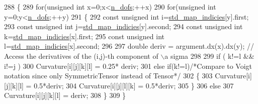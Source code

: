 \begin{DoxyCode}
288     \{
289          \textcolor{keywordflow}{for}(\textcolor{keywordtype}{unsigned} \textcolor{keywordtype}{int} x=0;x<\hyperlink{classSacado__Wrapper_1_1SymTensor2_ad9d6542de5481e0d41bd1831cb0aeaff}{n\_dofs};++x)
290             \textcolor{keywordflow}{for}(\textcolor{keywordtype}{unsigned} \textcolor{keywordtype}{int} y=0;y<\hyperlink{classSacado__Wrapper_1_1SymTensor2_ad9d6542de5481e0d41bd1831cb0aeaff}{n\_dofs};++y)
291             \{
292                 \textcolor{keyword}{const} \textcolor{keywordtype}{unsigned} \textcolor{keywordtype}{int} i=\hyperlink{classSacado__Wrapper_1_1SymTensor2_a1c6b89438714315ae209f4687b687505}{std\_map\_indicies}[y].first;
293                 \textcolor{keyword}{const} \textcolor{keywordtype}{unsigned} \textcolor{keywordtype}{int} j=\hyperlink{classSacado__Wrapper_1_1SymTensor2_a1c6b89438714315ae209f4687b687505}{std\_map\_indicies}[y].second;
294                 \textcolor{keyword}{const} \textcolor{keywordtype}{unsigned} \textcolor{keywordtype}{int} k=\hyperlink{classSacado__Wrapper_1_1SymTensor2_a1c6b89438714315ae209f4687b687505}{std\_map\_indicies}[x].first;
295                 \textcolor{keyword}{const} \textcolor{keywordtype}{unsigned} \textcolor{keywordtype}{int} l=\hyperlink{classSacado__Wrapper_1_1SymTensor2_a1c6b89438714315ae209f4687b687505}{std\_map\_indicies}[x].second;
296 
297                 \textcolor{keywordtype}{double} deriv = argument.dx(x).dx(y); \textcolor{comment}{// Access the derivatives of the (i,j)-th component of
       \(\backslash\)a sigma}
298 
299                 \textcolor{keywordflow}{if} ( k!=l && i!=j )
300                     Curvature[i][j][k][l] = 0.25* deriv;
301                 \textcolor{keywordflow}{else} \textcolor{keywordflow}{if}(k!=l)\textcolor{comment}{/*Compare to Voigt notation since only SymmetricTensor instead of Tensor*/}
302                 \{
303                     Curvature[i][j][k][l] = 0.5*deriv;
304                     Curvature[i][j][l][k] = 0.5*deriv;
305                 \}
306                 \textcolor{keywordflow}{else}
307                     Curvature[i][j][k][l] = deriv;
308             \}
309     \}
\end{DoxyCode}
